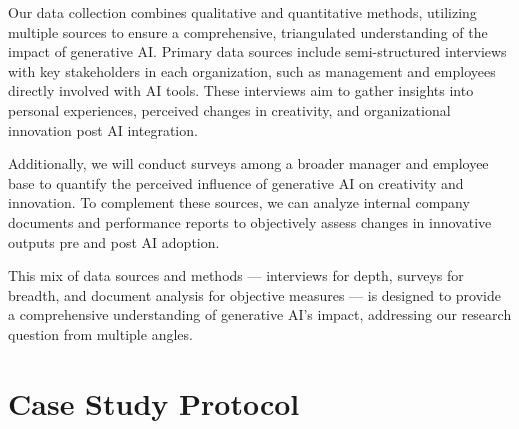 \documentclass[UTF8,a4paper,AutoFakeBold,AutoFakeSlant]{article}
\begin{document}
Our data collection combines qualitative and quantitative methods, utilizing multiple sources to ensure a comprehensive, triangulated understanding of the impact of generative AI. Primary data sources include semi-structured interviews with key stakeholders in each organization, such as management and employees directly involved with AI tools. These interviews aim to gather insights into personal experiences, perceived changes in creativity, and organizational innovation post AI integration.

Additionally, we will conduct surveys among a broader manager and employee base to quantify the perceived influence of generative AI on creativity and innovation. To complement these sources, we can analyze internal company documents and performance reports to objectively assess changes in innovative outputs pre and post AI adoption.

This mix of data sources and methods — interviews for depth, surveys for breadth, and document analysis for objective measures — is designed to provide a comprehensive understanding of generative AI’s impact, addressing our research question from multiple angles.


\section{Case Study Protocol}
\end{document}
